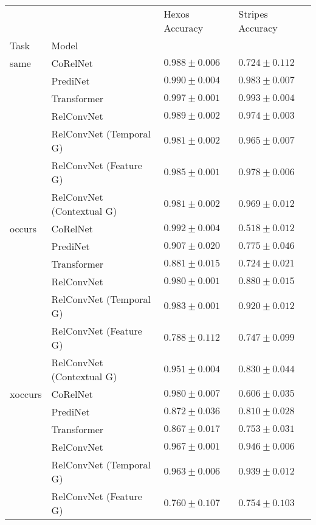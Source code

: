 \begin{tabular}{llll}
\toprule
              &                           &     Hexos Accuracy &   Stripes Accuracy \\
Task & Model &                    &                    \\
\midrule
same & CoRelNet &  $0.988 \pm 0.006$ &  $0.724 \pm 0.112$ \\
              & PrediNet &  $0.990 \pm 0.004$ &  $0.983 \pm 0.007$ \\
              & Transformer &  $0.997 \pm 0.001$ &  $0.993 \pm 0.004$ \\
              & RelConvNet &  $0.989 \pm 0.002$ &  $0.974 \pm 0.003$ \\
              & RelConvNet (Temporal G) &  $0.981 \pm 0.002$ &  $0.965 \pm 0.007$ \\
              & RelConvNet (Feature G) &  $0.985 \pm 0.001$ &  $0.978 \pm 0.006$ \\
              & RelConvNet (Contextual G) &  $0.981 \pm 0.002$ &  $0.969 \pm 0.012$ \\\hline
occurs & CoRelNet &  $0.992 \pm 0.004$ &  $0.518 \pm 0.012$ \\
              & PrediNet &  $0.907 \pm 0.020$ &  $0.775 \pm 0.046$ \\
              & Transformer &  $0.881 \pm 0.015$ &  $0.724 \pm 0.021$ \\
              & RelConvNet &  $0.980 \pm 0.001$ &  $0.880 \pm 0.015$ \\
              & RelConvNet (Temporal G) &  $0.983 \pm 0.001$ &  $0.920 \pm 0.012$ \\
              & RelConvNet (Feature G) &  $0.788 \pm 0.112$ &  $0.747 \pm 0.099$ \\
              & RelConvNet (Contextual G) &  $0.951 \pm 0.004$ &  $0.830 \pm 0.044$ \\\hline
xoccurs & CoRelNet &  $0.980 \pm 0.007$ &  $0.606 \pm 0.035$ \\
              & PrediNet &  $0.872 \pm 0.036$ &  $0.810 \pm 0.028$ \\
              & Transformer &  $0.867 \pm 0.017$ &  $0.753 \pm 0.031$ \\
              & RelConvNet &  $0.967 \pm 0.001$ &  $0.946 \pm 0.006$ \\
              & RelConvNet (Temporal G) &  $0.963 \pm 0.006$ &  $0.939 \pm 0.012$ \\
              & RelConvNet (Feature G) &  $0.760 \pm 0.107$ &  $0.754 \pm 0.103$ \\

\end{tabular}
